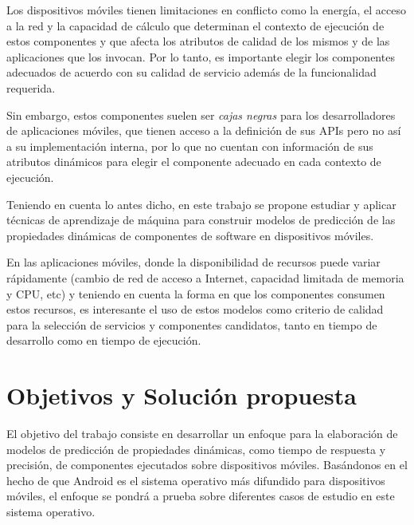 Los dispositivos móviles tienen limitaciones en conflicto como la
energía, el acceso a la red y la capacidad de cálculo que determinan
el contexto de ejecución de estos componentes y que afecta los atributos
de calidad de los mismos y de las aplicaciones que los invocan. Por
lo tanto, es importante elegir los componentes adecuados de acuerdo
con su calidad de servicio además de la funcionalidad requerida. 

Sin embargo, estos componentes suelen ser \emph{cajas negras} para
los desarrolladores de aplicaciones móviles, que tienen acceso a la
definición de sus \ac{API}s pero no así a su implementación interna,
por lo que no cuentan con información de sus atributos dinámicos para
elegir el componente adecuado en cada contexto de ejecución.

Teniendo en cuenta lo antes dicho, en este trabajo se propone estudiar
y aplicar técnicas de aprendizaje de máquina \cite{Mitchell2013}
 para construir modelos de predicción de las propiedades dinámicas
de componentes de software en dispositivos móviles. 

En las aplicaciones móviles, donde la disponibilidad de recursos puede
variar rápidamente (cambio de red de acceso a Internet, capacidad
limitada de memoria y \ac{CPU}, etc) y teniendo en cuenta la forma
en que los componentes consumen estos recursos, es interesante el
uso de estos modelos como criterio de calidad para la selección de
servicios y componentes candidatos, tanto en tiempo de desarrollo
como en tiempo de ejecución.


\section{Objetivos y Solución propuesta\label{sec:Objetivos-Soluci=0000F3n-propuesta}}

El objetivo del trabajo consiste en desarrollar un enfoque para la
elaboración de modelos de predicción de propiedades dinámicas, como
tiempo de respuesta y precisión, de componentes ejecutados sobre dispositivos
móviles. Basándonos en el hecho de que Android es el sistema operativo
más difundido para dispositivos móviles, el enfoque se pondrá a prueba
sobre diferentes casos de estudio en este sistema operativo. 

